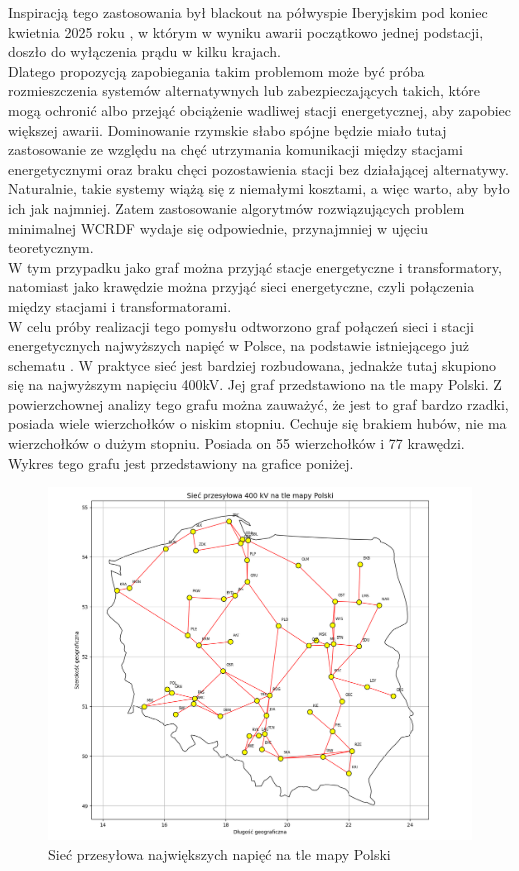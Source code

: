 Inspiracją tego zastosowania był blackout na półwyspie Iberyjskim pod koniec kwietnia 2025 roku \cite{BLACKOUT}, w którym w wyniku awarii początkowo jednej podstacji, doszło do wyłączenia prądu w kilku krajach. \\
Dlatego propozycją zapobiegania takim problemom może być próba rozmieszczenia systemów alternatywnych lub zabezpieczających takich, które mogą ochronić albo przejąć obciążenie wadliwej stacji energetycznej, aby zapobiec większej awarii. Dominowanie rzymskie słabo spójne będzie miało tutaj zastosowanie ze względu na chęć utrzymania komunikacji między stacjami energetycznymi oraz braku chęci pozostawienia stacji bez działającej alternatywy. Naturalnie, takie systemy wiążą się z niemałymi kosztami, a więc warto, aby było ich jak najmniej. Zatem zastosowanie algorytmów rozwiązujących problem minimalnej WCRDF wydaje się odpowiednie, przynajmniej w ujęciu teoretycznym.\\
W tym przypadku jako graf można przyjąć stacje energetyczne i transformatory, natomiast jako krawędzie można przyjąć sieci energetyczne, czyli połączenia między stacjami i transformatorami.\\
W celu próby realizacji tego pomysłu odtworzono graf połączeń sieci i stacji energetycznych najwyższych napięć w Polsce, na podstawie istniejącego już schematu \cite{POLAND}. W praktyce sieć jest bardziej rozbudowana, jednakże tutaj skupiono się na najwyższym napięciu 400kV. Jej graf przedstawiono na tle mapy Polski. Z powierzchownej analizy tego grafu można zauważyć, że jest to graf bardzo rzadki, posiada wiele wierzchołków o niskim stopniu. Cechuje się brakiem hubów, nie ma wierzchołków o dużym stopniu. Posiada on 55 wierzchołków i 77 krawędzi. Wykres tego grafu jest przedstawiony na grafice poniżej.

\begin{figure}[H]
    \centering
    \includegraphics[width=\textwidth]{assets/Poland/image.png}
    \caption{Sieć przesyłowa największych napięć na tle mapy Polski}
    \label{fig:poland}
\end{figure}


